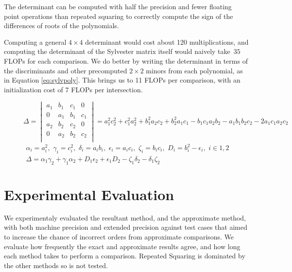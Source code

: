 \documentclass{cccg16}
\begin{document}
The determinant can be computed with half the precision and fewer
floating point operations than repeated squaring to correctly compute
the sign of the differences of roots of the polynomials.

Computing a general $4\times 4$ determinant would cost about 120
multiplications, and computing the determinant of the Sylvester matrix
itself would naively take~$35$ FLOPs for each comparison.  We do better by writing
the determinant in terms of the discriminants and other
precomputed $2\times 2$ minors from each polynomial, as in Equation
\ref{eq:sylvpoly}.  This brings us to 11 FLOPs per comparison, with an
initialization cost of 7 FLOPs per intersection.

\begin{figure}
  \begin{equation*}
    \Delta=\begin{vmatrix}
    a_1 & b_1 & c_1 & 0\\
    0 & a_1 & b_1 & c_1\\
    a_2 & b_2 & c_2 & 0\\
    0 & a_2 & b_2 & c_2\\
    \end{vmatrix}=
    a_1^2 c_2^2 + c_1^2 a_2^2 + b_1^2 a_2 c_2 + b_2^2 a_1 c_1 -
    b_1 c_1 a_2 b_2 - a_1 b_1 b_2 c_2 - 2 a_1 c_1 a_2 c_2
  \end{equation*}
  \begin{align}
    \alpha_i=a_i^2,\,\, \gamma_i=c_i^2,\,\,
    \delta_i=a_i b_i,\,\, \epsilon_i=a_i c_i,\,\, \zeta_i=b_i c_i,\,\,
    D_i=b_i^2-\epsilon_i,\,\,
    i\in {1, 2}\\
    \Delta = \alpha_1 \gamma_2 + \gamma_1 \alpha_2 +
    D_1 \epsilon_2 + \epsilon_1 D_2 - \zeta_1 \delta_2 -
    \delta_1 \zeta_2
  \label{eq:sylvpoly}
  \end{align}
\end{figure}

\section{Experimental Evaluation}
We experimentaly evaluated  the resultant method, and the  approximate method, with both machine
precision and extended precision against
test cases that aimed to increase the chance of incorrect orders from
approximate comparisons.  We evaluate how frequently the exact and
approximate results agree, and how long each method takes to perform a
comparison. Repeated Squaring is dominated by the other methods so is not tested.
\end{document}

